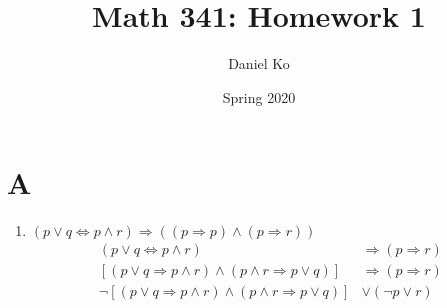 \documentclass[11pt]{scrartcl}
\title{Math 341: Homework 1}
\author{Daniel Ko}
\date{Spring 2020}
\begin{document}
\maketitle

\section{A}
\begin{enumerate}[label=\alph*.]
	\item{
		$(p \lor q \Leftrightarrow p \land r) \Rightarrow ((p \Rightarrow p) \land (p \Rightarrow r))$\\
		\begin{align*}
			(p \lor q \Leftrightarrow p \land r) & \Rightarrow (p \Rightarrow r) \tag{Transitivity}\\
			[(p \lor q \Rightarrow p \land r) \land (p \land r \Rightarrow p \lor q)] & \Rightarrow (p \Rightarrow r) \tag{Def. of bicondtional}\\
			\lnot [(p \lor q \Rightarrow p \land r) \land (p \land r \Rightarrow p \lor q)] & \lor (\lnot p \lor r) \tag{Material Implication}\\

		\end{align*}	
	}
\end{enumerate}
\end{document}

